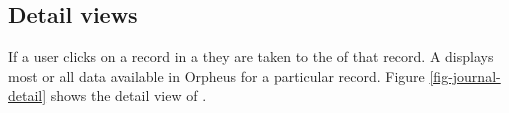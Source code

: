 \documentclass[british, 12pt]{article}
\begin{document}
\subsection{Detail views}
\label{sec-detail-views}
If a user clicks on a record in a  they are taken to the  of that record. A  displays most or all data available in Orpheus for a particular record. Figure \vref{fig-journal-detail} shows the detail view of .

\begin{figure}
  \begin{center}
\end{center}
\end{figure}
\end{document}
